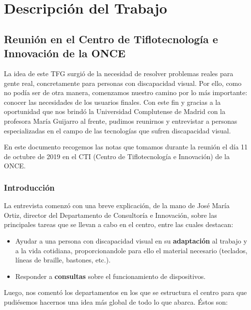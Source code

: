 \chapter{Descripción del Trabajo}
\label{cap:descripcionTrabajo}


\section{Reunión en el Centro de Tiflotecnología e Innovación de la ONCE}

La idea de este TFG surgió de la necesidad de resolver problemas reales para gente real, concretamente para personas con discapacidad visual. Por ello, como no podía ser de otra manera, comenzamos nuestro camino por lo más importante: conocer las necesidades de los usuarios finales. Con este fin y gracias a la oportunidad que nos  brindó la Universidad Complutense de Madrid con la profesora María Guijarro al frente, pudimos reunirnos y entrevistar a personas especializadas en el campo de las tecnologías que sufren discapacidad visual.

En este documento recogemos las notas que tomamos durante la reunión el día 11 de octubre de 2019 en el CTI (Centro de Tiflotecnología e Innovación) de la ONCE.
	

\subsection{Introducción}
La entrevista comenzó con una breve explicación, de la mano de José María Ortiz, director del Departamento de Consultoría e Innovación, sobre las principales tareas que se llevan a cabo en el centro, entre las cuales destacan:

\begin{itemize}
	\item Ayudar a una persona con discapacidad visual en su \textbf{adaptación} al trabajo y a la vida cotidiana, proporcionandole para ello el material necesario (teclados, líneas de braille, bastones, etc.).
	\item Responder a \textbf{consultas} sobre el funcionamiento de dispositivos.
\end{itemize}

Luego, nos comentó los departamentos en los que se estructura el centro para que pudiésemos hacernos una idea más global de todo lo que abarca. Éstos son:

